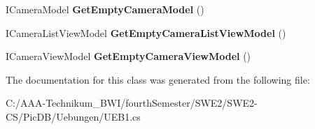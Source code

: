 \begin{DoxyCompactItemize}
\item 
\mbox{\label{class_uebungen_1_1_u_e_b1_a500229b56d68a51414f121e355e50c1f}} 
I\+Camera\+Model {\bfseries Get\+Empty\+Camera\+Model} ()
\item 
\mbox{\label{class_uebungen_1_1_u_e_b1_a0b7f9e362cde2924502e5db530f1500e}} 
I\+Camera\+List\+View\+Model {\bfseries Get\+Empty\+Camera\+List\+View\+Model} ()
\item 
\mbox{\label{class_uebungen_1_1_u_e_b1_afb0c4695d88ef13d9af96b1409e88a74}} 
I\+Camera\+View\+Model {\bfseries Get\+Empty\+Camera\+View\+Model} ()
\end{DoxyCompactItemize}


The documentation for this class was generated from the following file\+:\begin{DoxyCompactItemize}
\item 
C\+:/\+A\+A\+A-\/\+Technikum\+\_\+\+B\+W\+I/fourth\+Semester/\+S\+W\+E2/\+S\+W\+E2-\/\+C\+S/\+Pic\+D\+B/\+Uebungen/U\+E\+B1.\+cs\end{DoxyCompactItemize}
